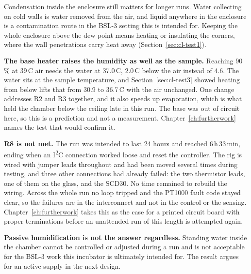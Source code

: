 Condensation inside the enclosure still matters for longer runs. Water collecting on cold walls is water removed from the air, and liquid anywhere in the enclosure is a contamination route in the BSL-3 setting this is intended for. Keeping the whole enclosure above the dew point means heating or insulating the corners, where the wall penetrations carry heat away (Section~\ref{sec:cl-test1}).

\textbf{The base heater raises the humidity as well as the sample.} Reaching 90\,\% at 39\,\textdegree{}C air needs the water at 37.0\,\textdegree{}C, 2.0\,\textdegree{}C below the air instead of 4.6. The water sits at the sample temperature, and Section~\ref{sec:cl-test3} showed heating from below lifts that from 30.9 to 36.7\,\textdegree{}C with the air unchanged. One change addresses R2 and R3 together, and it also speeds up evaporation, which is what held the chamber below the ceiling late in this run. The base was out of circuit here, so this is a prediction and not a measurement. Chapter~\ref{ch:furtherwork} names the test that would confirm it.

\textbf{R8 is not met.} The run was intended to last 24 hours and reached 6\,h\,33\,min, ending when an I\textsuperscript{2}C connection worked loose and reset the controller. The rig is wired with jumper leads throughout and had been moved several times during testing, and three other connections had already failed: the two thermistor leads, one of them on the glass, and the SCD30. No time remained to rebuild the wiring. Across the whole run no loop tripped and the PT1000 fault code stayed clear, so the failures are in the interconnect and not in the control or the sensing. Chapter~\ref{ch:furtherwork} takes this as the case for a printed circuit board with proper terminations before an unattended run of this length is attempted again.

\textbf{Passive humidification is not the answer regardless.} Standing water inside the chamber cannot be controlled or adjusted during a run and is not acceptable for the BSL-3 work this incubator is ultimately intended for. The result argues for an active supply in the next design.